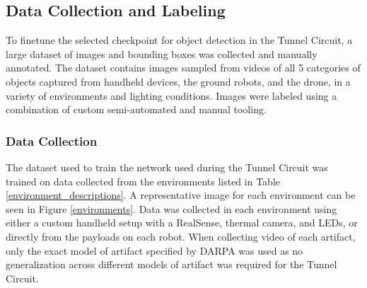 \subsection{Data Collection and Labeling}

To finetune the selected checkpoint for object detection in the Tunnel Circuit, a large dataset of images and bounding boxes was collected and manually annotated. The dataset contains images sampled from videos of all 5 categories of objects captured from handheld devices, the ground robots, and the drone, in a variety of environments and lighting conditions. Images were labeled using a combination of custom semi-automated and manual tooling.

\subsubsection{Data Collection}

The dataset used to train the network used during the Tunnel Circuit was trained on data collected from the environments listed in Table \ref{environment_descriptions}. A representative image for each environment can be seen in Figure \ref{environments}. Data was collected in each environment using either a custom handheld setup with a RealSense, thermal camera, and LEDs, or directly from the payloads on each robot. When collecting video of each artifact, only the exact model of artifact specified by DARPA was used as no generalization across different models of artifact was required for the Tunnel Circuit.

\begin{table}[]
	\centering
	\caption{List of environments where data was collected for the Tunnel Circuit dataset}
	\label{environment_descriptions}
\end{table}

